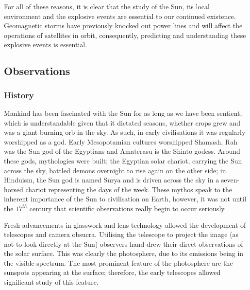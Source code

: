 For all of these reasons, it is clear that the study of the Sun, its local environment and the explosive events are essential to our continued existence.
Geomagnetic storms have previously knocked out power lines and will affect the operations of satellites in orbit, consequently, predicting and understanding these explosive events is essential.

\subsection{Observations}

\subsubsection{History}
Mankind has been fascinated with the Sun for as long as we have been sentient, which is understandable given that it dictated seasons, whether crops grew and was a giant burning orb in the sky.
As such, in early civilisations it was regularly worshipped as a god.
Early Mesopotamian cultures worshipped Shamash, Rah was the Sun god of the Egyptians and Amaterasu is the Shinto godess.
Around these gods, mythologies were built; the Egyptian solar chariot, carrying the Sun across the sky, battled demons overnight to rise again on the other side; in Hinduism, the Sun god is named Surya and is driven across the sky in a seven-horsed chariot representing the days of the week.
These mythos speak to the inherent importance of the Sun to civilisation on Earth, however, it was not until the $17^{th}$ century that scientific observations really begin to occur seriously.


Fresh advancements in glasswork and lens technology allowed the development of telescopes and camera obsucra.
Utilising the telescope to project the image (as not to look directly at the Sun) observers hand-drew their direct observations of the solar surface.
This was clearly the photosphere, due to its emissions being in the visible spectrum. 
The most prominent feature of the photosphere are the sunspots appearing at the surface; therefore, the early telescopes allowed significant study of this feature.

